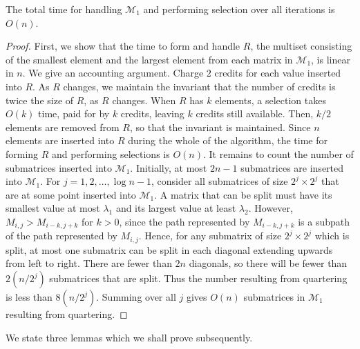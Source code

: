 \documentclass[12pt]{article}
\begin{document}
\begin{spacing}{3}
\begin{theorem}
\label{thm:selection}
The total time for handling $\mathcal{M}_1$ and performing selection over all iterations is $O(n)$.
\end{theorem}
\begin{proof}
First, we show that the time to form and handle $R$, the multiset consisting of the smallest element and the largest element from each matrix in $\mathcal{M}_1$, is linear in $n$. We give an accounting argument. Charge $2$ credits for each value inserted into $R$. As $R$ changes, we maintain the invariant that the number of credits is twice the size of $R$, as $R$ changes. When $R$ has $k$ elements, a selection takes $O(k)$ time, paid for by $k$ credits, leaving $k$ credits still available. Then, $k/2$ elements are removed from $R$, so that the invariant is maintained. Since $n$ elements are inserted into $R$ during the whole of %
the algorithm, the time for forming $R$ and performing selections is $O(n)$.
\vskip 0.2in\noindent
It remains to count the number of submatrices inserted into $\mathcal{M}_1$. Initially, at most $2n-1$ submatrices are inserted into $\mathcal{M}_1$. For $j = 1, 2, \ldots,\log n - 1$, consider all submatrices of size $2^j\times 2^j$ that are at some point inserted into $\mathcal{M}_1$. A matrix that can be split must have its smallest value at most $\lambda_1$ and its largest value at least $\lambda_2$. However, $M_{i,j}>M_{i-k,j+k}$ for $k>0$, since the path represented by $M_{i-k,j+k}$ is a subpath of the path represented by $M_{i,j}$. Hence, for any submatrix of size $2^j\times 2^j$ which is split, at most one submatrix can be split in each diagonal extending upwards from left to right. There are fewer than $2n$ diagonals, so there will be fewer than $2(n/2^j)$ submatrices that are split. Thus the number resulting from quartering is less than $8(n/2^j)$. Summing over all $j$ gives $O(n)$ submatrices in $\mathcal{M}_1$ resulting from quartering.
\end{proof}

\noindent
We state three lemmas which we shall prove subsequently.


\end{spacing}
\end{document}
